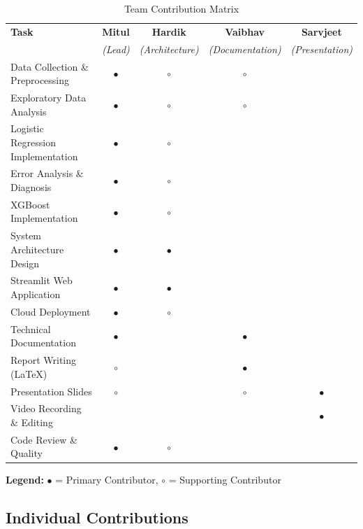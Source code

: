 \documentclass[12pt,a4paper]{article}
\begin{document}
\begin{table}[H]
\centering
\caption{Team Contribution Matrix}
\begin{tabular}{lcccc}
\toprule
\textbf{Task} & \textbf{Mitul} & \textbf{Hardik} & \textbf{Vaibhav} & \textbf{Sarvjeet} \\
 & \textit{(Lead)} & \textit{(Architecture)} & \textit{(Documentation)} & \textit{(Presentation)} \\
\midrule
Data Collection \& Preprocessing & $\bullet$ & $\circ$ & $\circ$ & \\
Exploratory Data Analysis & $\bullet$ & $\circ$ & $\circ$ & \\
Logistic Regression Implementation & $\bullet$ & $\circ$ & & \\
Error Analysis \& Diagnosis & $\bullet$ & $\circ$ & & \\
XGBoost Implementation & $\bullet$ & $\circ$ & & \\
System Architecture Design & $\bullet$ & $\bullet$ & & \\
Streamlit Web Application & $\bullet$ & $\bullet$ & & \\
Cloud Deployment & $\bullet$ & $\circ$ & & \\
Technical Documentation & $\bullet$ & & $\bullet$ & \\
Report Writing (LaTeX) & $\circ$ & & $\bullet$ & \\
Presentation Slides & $\circ$ & & $\circ$ & $\bullet$ \\
Video Recording \& Editing & & & & $\bullet$ \\
Code Review \& Quality & $\bullet$ & $\circ$ & & \\
\bottomrule
\end{tabular}

\vspace{0.3cm}
\textbf{Legend:} $\bullet$ = Primary Contributor, $\circ$ = Supporting Contributor
\end{table}

\subsection{Individual Contributions}
\end{document}
